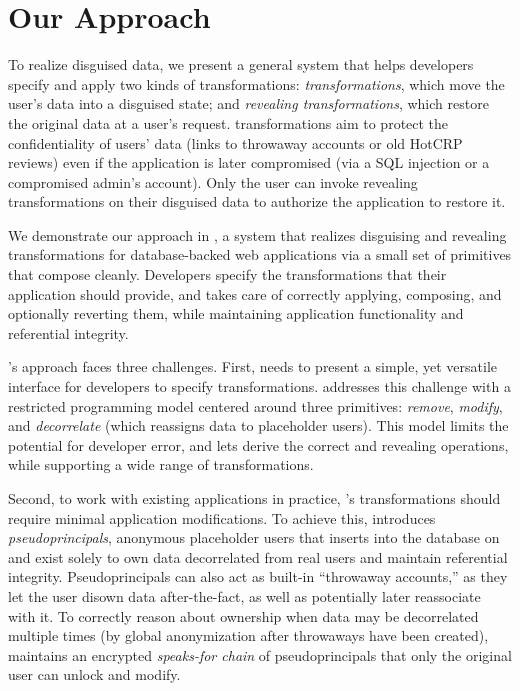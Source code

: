 \section{Our Approach}
%
To realize disguised data, we present a general system that helps developers
specify and apply two kinds of transformations: \emph{\xxing transformations},
which move the user's data into a disguised state; and \emph{revealing
transformations}, which restore the original data at a user’s request.
%
\Xxing transformations aim to protect the confidentiality of users' \xxed data
(\eg links to throwaway accounts or old HotCRP reviews) even if the application
is later compromised (\eg via a SQL injection or a compromised admin's account).
%
Only the user can invoke revealing transformations on their disguised data to
authorize the application to restore it.
%

%
We demonstrate our approach in \sys, a system that realizes disguising and
revealing transformations for database-backed web applications via a small set of
primitives that compose cleanly.
%
Developers specify the transformations that their application should provide,
and \sys takes care of correctly applying, composing, and optionally reverting
them, while maintaining application functionality and referential integrity.
%

\sys's approach faces three challenges.
First, \sys needs to present a simple, yet versatile interface for developers to
specify \xxing transformations.
%
\sys addresses this challenge with a restricted programming model centered
around three primitives: \emph{remove}, \emph{modify}, and \emph{decorrelate} (which reassigns data
to placeholder users).
%
This model limits the potential for developer error, and lets \sys derive the
correct \xxing and revealing operations, while supporting a wide range of
transformations.
%

%
Second, to work with existing applications in practice, \sys's \xxing
transformations should require minimal application modifications.
%
To achieve this, \sys introduces \emph{pseudoprincipals}, anonymous placeholder
users that \sys inserts into the database on \xxing and exist solely to own data
decorrelated from real users and maintain referential integrity.
%
Pseudoprincipals can also act as built-in ``throwaway accounts,'' as they let
the user disown data after-the-fact, as well as potentially later reassociate
with it.
%
To correctly reason about ownership when data may be decorrelated multiple times
(\eg by global anonymization after throwaways have been created), \sys maintains
an encrypted \emph{speaks-for chain} of pseudoprincipals that only the original user
can unlock and modify.
%

